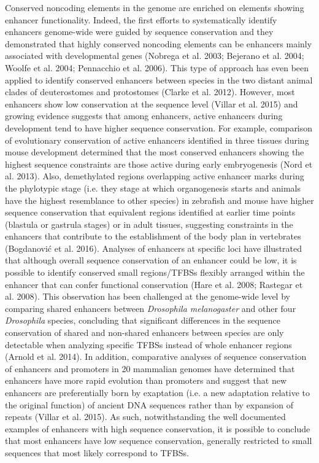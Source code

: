 Conserved noncoding elements in the genome are enriched on elements showing enhancer functionality. Indeed, the first efforts to systematically identify enhancers genome-wide were guided by sequence conservation and they demonstrated that highly conserved noncoding elements can be enhancers mainly associated with developmental genes (Nobrega et al. 2003; Bejerano et al. 2004; Woolfe et al. 2004; Pennacchio et al. 2006). This type of approach has even been applied to identify conserved enhancers between species in the two distant animal clades of deuterostomes and protostomes (Clarke et al. 2012). However, most enhancers show low conservation at the sequence level (Villar et al. 2015) and growing evidence suggests that among enhancers, active enhancers during development tend to have higher sequence conservation. For example, comparison of evolutionary conservation of active enhancers identified in three tissues during mouse development determined that the most conserved enhancers showing the highest sequence constraints are those active during early embryogenesis (Nord et al. 2013). Also, demethylated regions overlapping active enhancer marks during the phylotypic stage (i.e. they stage at which organogenesis starts and animals have the highest resemblance to other species) in zebrafish and mouse have higher sequence conservation that equivalent regions identified at earlier time points (blastula or gastrula stages) or in adult tissues, suggesting constraints in the enhancers that contribute to the establishment of the body plan in vertebrates (Bogdanović et al. 2016). Analyses of enhancers at specific loci have illustrated that although overall sequence conservation of an enhancer could be low, it is possible to identify conserved small regions/TFBSs flexibly arranged within the enhancer that can confer functional conservation (Hare et al. 2008; Rastegar et al. 2008). This observation has been challenged at the genome-wide level by comparing shared enhancers between \textit{Drosophila melanogaster} and other four \textit{Drosophila} species, concluding that significant differences in the sequence conservation of shared and non-shared enhancers between species are only detectable when analyzing specific TFBSs instead of whole enhancer regions (Arnold et al. 2014). In addition, comparative analyses of sequence conservation of enhancers and promoters in 20 mammalian genomes have determined that enhancers have more rapid evolution than promoters and suggest that new enhancers are preferentially born by exaptation (i.e. a new adaptation relative to the original function) of ancient DNA sequences rather than by expansion of repeats (Villar et al. 2015). As such, notwithstanding the well documented examples of enhancers with high sequence conservation, it is possible to conclude that most enhancers have low sequence conservation, generally restricted to small sequences that most likely correspond to TFBSs.\\ 


